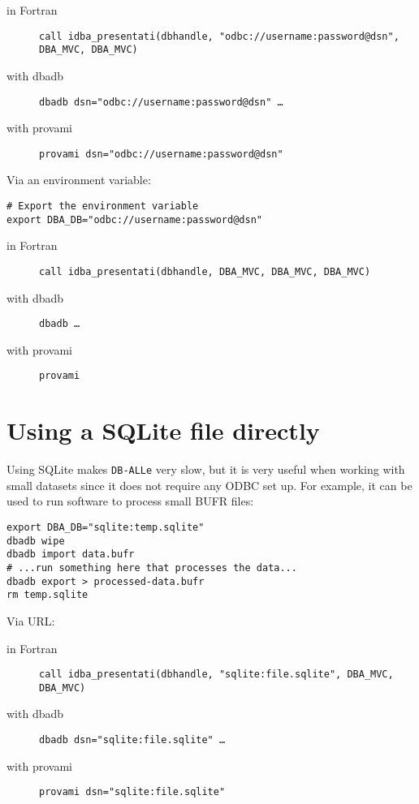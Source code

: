 \documentclass[final,12pt,a4paper,twoside]{book}
\newcommand{\dballe}{{\tt DB-ALLe}}
\begin{document}
\begin{description}
\item[in Fortran]
  {\tt call idba\_presentati(dbhandle, "odbc://username:password@dsn", DBA\_MVC, DBA\_MVC)}
\item[with dbadb]
  {\tt dbadb \-\-dsn="odbc://username:password@dsn" \dots}
\item[with provami]
  {\tt provami \-\-dsn="odbc://username:password@dsn"}
\end{description}

Via an environment variable:

\begin{verbatim}
# Export the environment variable
export DBA_DB="odbc://username:password@dsn"
\end{verbatim}

\begin{description}
\item[in Fortran]
  {\tt call idba\_presentati(dbhandle, DBA\_MVC, DBA\_MVC, DBA\_MVC)}
\item[with dbadb]
  {\tt dbadb \dots}
\item[with provami]
  {\tt provami}
\end{description}

\section{Using a SQLite file directly}

Using SQLite makes \dballe{} very slow, but it is very useful when working with
small datasets since it does not require any ODBC set up. For example, it can
be used to run software to process small BUFR files:

\begin{verbatim}
export DBA_DB="sqlite:temp.sqlite"
dbadb wipe
dbadb import data.bufr
# ...run something here that processes the data...
dbadb export > processed-data.bufr
rm temp.sqlite
\end{verbatim}

Via URL:

\begin{description}
\item[in Fortran]
  {\tt call idba\_presentati(dbhandle, "sqlite:file.sqlite", DBA\_MVC, DBA\_MVC)}
\item[with dbadb]
  {\tt dbadb \-\-dsn="sqlite:file.sqlite" \dots}
\item[with provami]
  {\tt provami \-\-dsn="sqlite:file.sqlite"}
\end{description}
\end{document}
